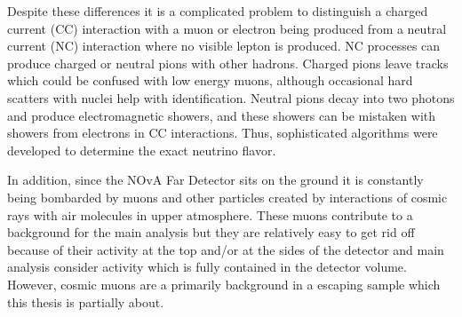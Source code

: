 Despite these differences it is a complicated problem to distinguish a charged current (CC) interaction with
a muon or electron being produced from a neutral current (NC) interaction where no visible lepton is produced.
NC processes can produce charged or neutral pions with other hadrons. Charged pions
leave tracks which could be confused with low energy muons, although occasional hard scatters with 
nuclei help with identification. Neutral pions decay into two photons and produce electromagnetic
showers, and these showers can be mistaken with showers from electrons in CC interactions.
Thus, sophisticated algorithms were developed to determine the exact neutrino flavor.

In addition, since the NOvA Far Detector sits on the ground it is constantly being bombarded by muons and other
particles created by interactions of cosmic rays with air molecules in upper atmosphere. 
These muons contribute to a background for the main analysis but they are relatively easy to get rid off
because of their activity at the top and/or at the sides of the detector and main analysis consider activity 
which is fully contained in the detector volume. However, cosmic muons are a primarily background in a escaping 
sample which this thesis is partially about.

